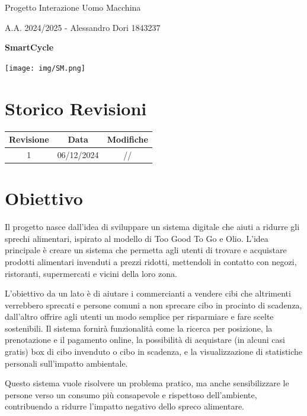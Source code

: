 \documentclass{article}
\begin{document}
\begin{center}
    \Huge Progetto Interazione Uomo Macchina
        \vspace{0.5cm}

        \large A.A. 2024/2025 - Alessandro Dori 1843237
        \vspace{1cm}

        \large \textsf{\textbf{SmartCycle}}

        \texttt{[image: img/SM.png]}
\end{center}

\section{Storico Revisioni}
\begin{table}[H]
    \centering
    \begin{tabular}{|c|c|c|}
        \hline
        \textbf{Revisione} & \textbf{Data} & \textbf{Modifiche} \\ \hline
        1 & 06/12/2024 & // \\ \hline
    \end{tabular}
\end{table}

\section{Obiettivo}
Il progetto nasce dall'idea di sviluppare un sistema digitale che aiuti a ridurre gli sprechi alimentari, ispirato al modello di Too Good To Go e Olio. 
L’idea principale è creare un sistema che permetta agli utenti di trovare e acquistare prodotti alimentari invenduti a prezzi ridotti, mettendoli in contatto con negozi, ristoranti, supermercati e vicini della loro zona.

L’obiettivo da un lato è di aiutare i commercianti a vendere cibi che altrimenti verrebbero sprecati e persone comuni a non sprecare cibo in procinto di scadenza, dall’altro offrire agli utenti un modo semplice per risparmiare e fare scelte sostenibili. 
Il sistema fornirà funzionalità come la ricerca per posizione, la prenotazione e il pagamento online, la possibilità di acquistare (in alcuni casi gratis) box di cibo invenduto o cibo in scadenza, e la visualizzazione di statistiche personali sull’impatto ambientale.

Questo sistema vuole risolvere un problema pratico, ma anche sensibilizzare le persone verso un consumo più consapevole e rispettoso dell’ambiente, contribuendo a ridurre l’impatto negativo dello spreco alimentare.
\end{document}
